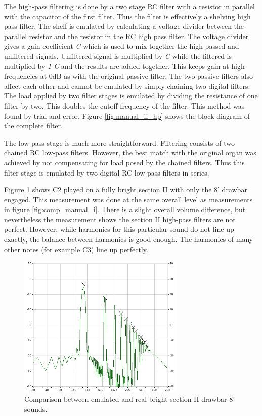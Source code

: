 \documentclass[11pt,a4paper]{article}
\begin{document}

The high-pass filtering is done by a two stage RC filter with a resistor in parallel with the capacitor of the first filter. Thus the filter is effectively a shelving high pass filter. The shelf is emulated by calculating a voltage divider between the parallel resistor and the resistor in the RC high pass filter. The voltage divider gives a gain coefficient \emph{C} which is used to mix together the high-passed and unfiltered signals. Unfiltered signal is multiplied by \emph{C} while the filtered is multiplied by \emph{1-C} and the results are added together. This keeps gain at high frequencies at 0dB as with the original passive filter. The two passive filters also affect each other and cannot be emulated by simply chaining two digital filters. The load applied by two filter stages is emulated by dividing the resistance of one filter by two. This doubles the cutoff frequency of the filter. This method was found by trial and error. Figure \ref{fig:manual_ii_hp} shows the block diagram of the complete filter.

The low-pass stage is much more straightforward. Filtering consists of two chained RC low-pass filters. However, the best match with the original organ was achieved by not compensating for load posed by the chained filters. Thus this filter stage is emulated by two digital RC low pass filters in series.


Figure \ref{fig:comp_manual_ii} shows C2 played on a fully bright section II with only the 8' drawbar engaged. This measurement was done at the same overall level as measurements in figure \ref{fig:comp_manual_i}. There is a slight overall volume difference, but nevertheless the measurement shows the section II high-pass filters are not perfect. However, while harmonics for this particular sound do not line up exactly, the balance between harmonics is good enough. The harmonics of many other notes (for example C3) line up perfectly.

\begin{figure}[tbp]
\centering
\includegraphics[width=80mm]{analysis/manual_ii_compare.png}
\caption{Comparison between emulated and real bright section II drawbar 8' sounds.}
\label{fig:comp_manual_ii}
\end{figure}
\end{document}
